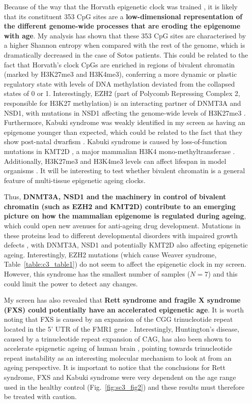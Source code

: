 Because of the way that the Horvath epigenetic clock was trained \citep{Horvath2013}, it is likely that its constituent 353 CpG sites are a \textbf{low-dimensional representation of the different genome-wide processes that are eroding the epigenome with age}. My analysis has shown that these 353 CpG sites are characterised by a higher Shannon entropy when compared with the rest of the genome, which is dramatically decreased in the case of Sotos patients. This could be related to the fact that Horvath's clock CpGs are enriched in regions of bivalent chromatin (marked by H3K27me3 and H3K4me3), conferring a more dynamic or plastic regulatory state with levels of DNA methylation deviated from the collapsed states of 0 or 1. Interestingly, EZH2 (part of Polycomb Repressing Complex 2, responsible for H3K27 methylation) is an interacting partner of DNMT3A and NSD1, with mutations in NSD1 affecting the genome-wide levels of H3K27me3 \citep{Streubel2018}. Furthermore, Kabuki syndrome was weakly identified in my screen as having an epigenome younger than expected, which could be related to the fact that they show post-natal dwarfism \citep{Aref-Eshghi2017,Butcher2017}. Kabuki syndrome is caused by loss-of-function mutations in KMT2D \citep{Aref-Eshghi2017,Butcher2017}, a major mammalian H3K4 mono-methyltransferase \citep{Froimchuk2017}. Additionally, H3K27me3 and H3K4me3 levels can affect lifespan in model organisms \citep{Sen2016}. It will be interesting to test whether bivalent chromatin is a general feature of multi-tissue epigenetic ageing clocks.

\bigskip

Thus, \textbf{DNMT3A, NSD1 and the machinery in control of bivalent chromatin (such as EZH2 and KMT2D) contribute to an emerging picture on how the mammalian epigenome is regulated during ageing}, which could open new avenues for anti-ageing drug development. Mutations in these proteins lead to different developmental disorders with impaired growth defects \citep{Bjornsson2015}, with DNMT3A, NSD1 and potentially KMT2D also affecting epigenetic ageing. Interestingly, EZH2 mutations (which cause Weaver syndrome, Table~\ref{table:c3_table1}) do not seem to affect the epigenetic clock in my screen. However, this syndrome has the smallest number of samples ($N=7$) and this could limit the power to detect any changes.

\bigskip

My screen has also revealed that \textbf{Rett syndrome and fragile X syndrome (\acrshort{FXS}) could potentially have an accelerated epigenetic age}. It is worth noting that FXS is caused by an expansion of the CGG trinucleotide repeat located in the 5' \acrshort{UTR} of the FMR1 gene \citep{Schenkel2016}. Interestingly, Huntington's disease, caused by a trinucleotide repeat expansion of CAG, has also been shown to accelerate epigenetic ageing of human brain \citep{Horvath2016a}, pointing towards trinucleotide repeat instability as an interesting molecular mechanism to look at from an ageing perspective. It is important to notice that the conclusions for Rett syndrome, FXS and Kabuki syndrome were very dependent on the age range used in the healthy control (Fig.~\ref{fig:sc3_fig2}) and these results must therefore be treated with caution.

